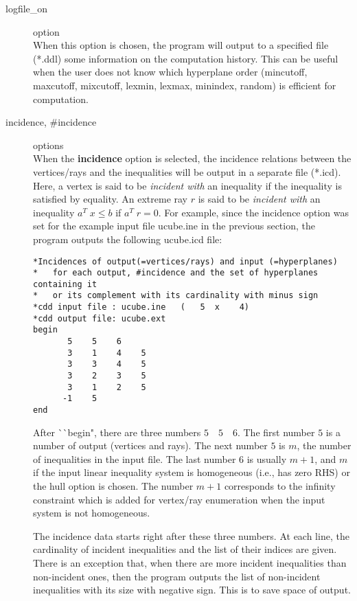\begin{description}
\item[logfile\_on] option\\
 When this option is chosen, the program will output
to a specified file (*.ddl) some information on the computation history.
This can be useful when the user does not know which hyperplane order
(mincutoff, maxcutoff, mixcutoff, lexmin, lexmax, minindex, random)
is efficient for computation.

\item[incidence, \#incidence] options\\
When the {\bf incidence} option is selected, the incidence relations between
the vertices/rays and the inequalities will be output
in a separate file (*.icd).  Here, a vertex is said to be 
{\em incident with\/} an inequality if the inequality is satisfied by equality.
An extreme ray $r$ is said to be {\em incident with\/} 
an inequality $a^T \; x \le b$ if  $a^T \; r = 0$.  For example,
since the incidence option was set for the example input file ucube.ine in
the previous section, the program outputs the following ucube.icd file:
\begin{verbatim}
*Incidences of output(=vertices/rays) and input (=hyperplanes)
*   for each output, #incidence and the set of hyperplanes containing it
*   or its complement with its cardinality with minus sign
*cdd input file : ucube.ine   (   5  x    4)
*cdd output file: ucube.ext
begin
       5    5    6
       3    1    4    5
       3    3    4    5
       3    2    3    5
       3    1    2    5
      -1    5
end
\end{verbatim}
After ^^ ^^ begin", there are three numbers $5 \quad 5 \quad 6$.
The first number $5$ is a number of output (vertices and rays).
The next number $5$ is $m$, the number of inequalities in the input file.
The last number $6$ is usually $m+1$, and $m$ if the input linear inequality
system is homogeneous (i.e., has zero RHS) or the hull option is chosen.
The number $m+1$ corresponds to the infinity constraint which is added
for vertex/ray enumeration when the input system is not homogeneous.

The incidence data starts right after these three numbers.
At each line, the cardinality of incident inequalities and
the list of their indices are given.  There is an exception that, when
there are more incident inequalities than non-incident ones, then the program
outputs the list of non-incident inequalities with its
size with negative sign.  This is to save space of output.


\end{description}
